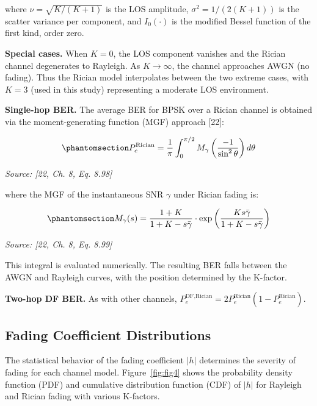 where \(\nu = \sqrt{K/(K+1)}\) is the LOS amplitude, \(\sigma^2 = 1/(2(K+1))\) is the scatter variance per component, and \(I_0(\cdot)\) is the modified Bessel function of the first kind, order zero.

\textbf{Special cases.} When \(K = 0\), the LOS component vanishes and the Rician channel degenerates to Rayleigh. As \(K \to \infty\), the channel approaches AWGN (no fading). Thus the Rician model interpolates between the two extreme cases, with \(K=3\) (used in this study) representing a moderate LOS environment.

\textbf{Single-hop BER.} The average BER for BPSK over a Rician channel is obtained via the moment-generating function (MGF) approach {[}22{]}:

\begin{equation}\protect\phantomsection\label{eq:rician-ber-mgf}{P_e^{\text{Rician}} = \frac{1}{\pi} \int_0^{\pi/2} M_{\gamma}\left(\frac{-1}{\sin^2\theta}\right) d\theta
}\end{equation} \par{\small\textit{Source: [22, Ch. 8, Eq. 8.98]}}

where the MGF of the instantaneous SNR \(\gamma\) under Rician fading is:

\begin{equation}\protect\phantomsection\label{eq:rician-mgf}{M_{\gamma}(s) = \frac{1+K}{1+K - s\bar{\gamma}} \cdot \exp\left(\frac{Ks\bar{\gamma}}{1+K-s\bar{\gamma}}\right)
}\end{equation} \par{\small\textit{Source: [22, Ch. 8, Eq. 8.99]}}

This integral is evaluated numerically. The resulting BER falls between the AWGN and Rayleigh curves, with the position determined by the K-factor.

\textbf{Two-hop DF BER.} As with other channels, \(P_e^{\text{DF,Rician}} = 2P_e^{\text{Rician}}(1 - P_e^{\text{Rician}})\).


\subsection{Fading Coefficient Distributions}\label{sec:fading-coefficient-distributions}

The statistical behavior of the fading coefficient \(|h|\) determines the severity of fading for each channel model. Figure~\ref{fig:fig4} shows the probability density function (PDF) and cumulative distribution function (CDF) of \(|h|\) for Rayleigh and Rician fading with various K-factors.

